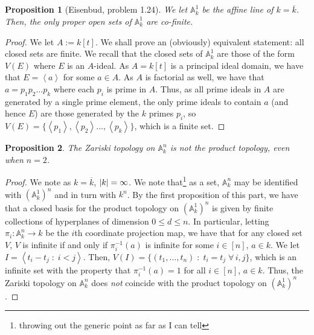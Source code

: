 \documentclass[english]{article}
\DeclarePairedDelimiter\abs{\lvert}{\rvert}%
\renewcommand{\AA}{\mathbb{A}}
\newcommand{\prt}[1]{\setcounter{subsection}{#1-1}\subsection{}}
\newtheorem*{prop*}{Proposition}
\theoremstyle{remark}
\theoremstyle{definition}
\newcommand{\acl}{\overline}
\newcommand{\idl}[1]{\left\langle{#1}\right\rangle }
\begin{document}
\prt{2}
\begin{prop*}[Eisenbud, problem 1.24]
	We let $\AA_k^1$ be the affine line of $k=\acl{k}$. Then, the only proper open sets of $\AA_k^1$ are co-finite. 
\end{prop*}
\begin{proof} We let $A:=k[t]$.
	We shall prove an (obviously) equivalent statement: all closed sets are finite. We recall that the closed sets of $\AA_k^1$ are those of the form $V(E)$ where $E$ is an $A$-ideal. As $A=k[t]$ is a principal ideal domain, we have that $E=\idl{a}$ for some $a\in A$. As $A$ is factorial as well, we have that $a=p_1p_2\hdots p_k$ where each $p_i$ is prime in $A$. Thus, as all prime ideals in $A$ are generated by a single prime element, the only prime ideals to contain $a$ (and hence $E$) are those generated by the $k$ primes $p_i$, so $V(E)=\{\idl{p_1},\idl{p_2}\hdots,\idl{p_k}\}$, which is a finite set. 
	\end{proof}
\begin{prop*}
	The Zariski topology on $\AA_k^n$ is not the product topology, even when $n=2$. 
\end{prop*}
\begin{proof}
	We note as $k=\overline{k}$, $\abs{k}=\infty$. We note that\footnote{throwing out the generic point as far as I can tell\textellipsis} as a set, $\AA_k^n$ may be identified with $(\AA_k^1)^n$ and in turn with $k^n$. By the first proposition of this part, we have that a closed basis for the product topology on $(\AA_k^1)^n$ is given by finite collections of hyperplanes of dimension $0\leq d\leq n$. In particular, letting $\pi_i:\AA^n_k\to k$ be the $i$th coordinate projection map, we have that for any closed set $V$, $V$ is infinite if and only if $\pi_i^{-1}(a)$ is infinite for some $i\in [n]$, $a\in k$. We let $I=\idl{t_i-t_j\;:\;i<j}$. Then, $V(I)=\{(t_1,\hdots,t_n)\;:\;t_i=t_j \;\forall\, i,j\}$, which is an infinite set with the property that $\pi_i^{-1}(a)=1$ for all $i\in [n]$, $a\in k$. Thus, the Zariski topology on $\AA_k^n$ does \emph{not} coincide with the product topology on $(\AA_k^1)^n$.
\end{proof}
\end{document}
